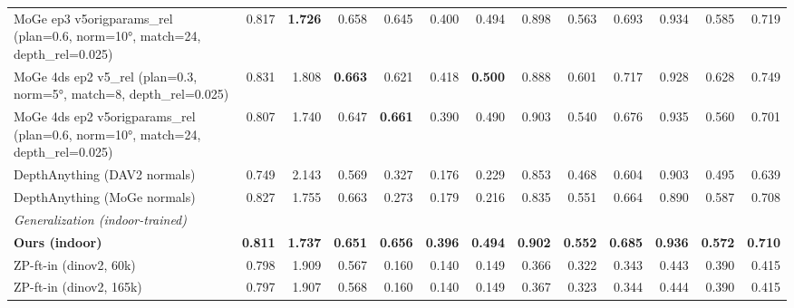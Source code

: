 \documentclass[10pt]{article}
\begin{document}
\begin{table}[t]
{\begin{tabular}{l r r r r r r r r r r r r}
MoGe ep3 v5origparams\_rel (plan=0.6, norm=10°, match=24, depth\_rel=0.025) & 0.817 & \textbf{1.726} & 0.658 & 0.645 & 0.400 & 0.494 & 0.898 & 0.563 & 0.693 & 0.934 & 0.585 & 0.719 \\
MoGe 4ds ep2 v5\_rel (plan=0.3, norm=5°, match=8, depth\_rel=0.025) & 0.831 & 1.808 & \textbf{0.663} & 0.621 & 0.418 & \textbf{0.500} & 0.888 & 0.601 & 0.717 & 0.928 & 0.628 & 0.749 \\
MoGe 4ds ep2 v5origparams\_rel (plan=0.6, norm=10°, match=24, depth\_rel=0.025) & 0.807 & 1.740 & 0.647 & \textbf{0.661} & 0.390 & 0.490 & 0.903 & 0.540 & 0.676 & 0.935 & 0.560 & 0.701 \\
DepthAnything (DAV2 normals) & 0.749 & 2.143 & 0.569 & 0.327 & 0.176 & 0.229 & 0.853 & 0.468 & 0.604 & 0.903 & 0.495 & 0.639 \\
DepthAnything (MoGe normals) & 0.827 & 1.755 & 0.663 & 0.273 & 0.179 & 0.216 & 0.835 & 0.551 & 0.664 & 0.890 & 0.587 & 0.708 \\
\midrule
\multicolumn{13}{l}{\textit{Generalization (indoor-trained)}} \\
\textbf{Ours (indoor)} & \textbf{0.811} & \textbf{1.737} & \textbf{0.651} & \textbf{0.656} & \textbf{0.396} & \textbf{0.494} & \textbf{0.902} & \textbf{0.552} & \textbf{0.685} & \textbf{0.936} & \textbf{0.572} & \textbf{0.710} \\
ZP-ft-in (dinov2, 60k) & 0.798 & 1.909 & 0.567 & 0.160 & 0.140 & 0.149 & 0.366 & 0.322 & 0.343 & 0.443 & 0.390 & 0.415 \\
ZP-ft-in (dinov2, 165k) & 0.797 & 1.907 & 0.568 & 0.160 & 0.140 & 0.149 & 0.367 & 0.323 & 0.344 & 0.444 & 0.390 & 0.415 \\
\bottomrule
\end{tabular}%
}
\end{table}

\clearpage
\end{document}
